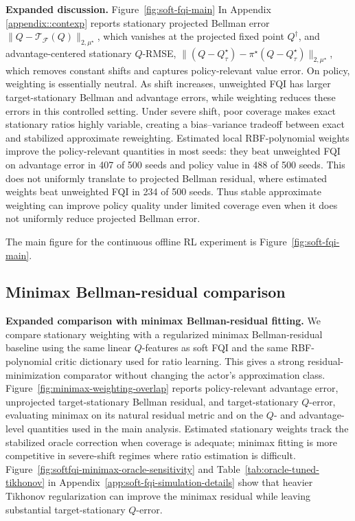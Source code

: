 \documentclass{article}
\theoremstyle{plain}
\theoremstyle{definition}
\theoremstyle{remark}
\begin{document}
\textbf{Expanded discussion.} Figure~\ref{fig:soft-fqi-main} In Appendix \ref{appendix::contexp} reports stationary projected Bellman error
\(\|Q-\mathcal T_{\mathcal F}(Q)\|_{2,\mu^\star}\), which vanishes at the
projected fixed point \(Q^\dagger\), and advantage-centered stationary
\(Q\)-RMSE,
\(\|(Q-Q^\star_\tau)-\pi^\star(Q-Q^\star_\tau)\|_{2,\mu^\star}\), which removes
constant shifts and captures policy-relevant value error. On policy, weighting
is essentially neutral. As shift increases, unweighted FQI has larger
target-stationary Bellman and advantage errors, while weighting reduces these
errors in this controlled setting. Under severe shift, poor coverage makes
exact stationary ratios highly variable, creating a bias--variance tradeoff
between exact and stabilized approximate reweighting. Estimated local
RBF-polynomial weights improve the policy-relevant quantities in most seeds:
they beat unweighted FQI on advantage error in 407 of 500 seeds and policy value
in 488 of 500 seeds. This does not uniformly translate to projected Bellman
residual, where estimated weights beat unweighted FQI in 234 of 500 seeds. Thus
stable approximate weighting can improve policy quality under limited coverage
even when it does not uniformly reduce projected Bellman error.




The main figure for the continuous offline RL experiment is
Figure~\ref{fig:soft-fqi-main}.


 



\subsection{Minimax Bellman-residual comparison}
\label{appendix::minimax}

\textbf{Expanded comparison with minimax Bellman-residual fitting.}
We compare stationary weighting with a regularized minimax Bellman-residual
baseline using the same linear \(Q\)-features as soft FQI and the same
RBF-polynomial critic dictionary used for ratio learning. This gives a strong
residual-minimization comparator without changing the actor's approximation
class. Figure~\ref{fig:minimax-weighting-overlap} reports policy-relevant
advantage error, unprojected target-stationary Bellman residual, and
target-stationary \(Q\)-error, evaluating minimax on its natural residual metric
and on the \(Q\)- and advantage-level quantities used in the main analysis.
Estimated stationary weights track the stabilized oracle correction when
coverage is adequate; minimax fitting is more competitive in severe-shift
regimes where ratio estimation is difficult.
Figure~\ref{fig:softfqi-minimax-oracle-sensitivity} and
Table~\ref{tab:oracle-tuned-tikhonov} in Appendix~\ref{app:soft-fqi-simulation-details} show that heavier Tikhonov regularization
can improve the minimax residual while leaving substantial target-stationary
\(Q\)-error.
\end{document}
